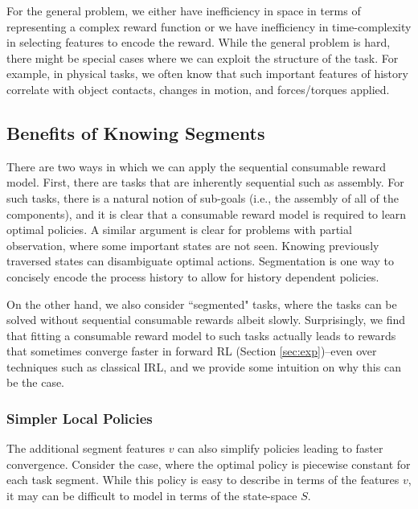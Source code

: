 \vspace{0.5em}

For the general problem, we either have inefficiency in space in terms of representing a complex reward function or we have inefficiency in time-complexity in selecting features to encode the reward.
While the general problem is hard, there might be special cases where we can exploit the structure of the task.
For example, in physical tasks, we often know that such important features of history correlate with object contacts, changes in motion, and forces/torques applied.
\fi

\subsection{Benefits of Knowing Segments}
There are two ways in which we can apply the sequential consumable reward model.
First, there are tasks that are inherently sequential such as assembly.
For such tasks, there is a natural notion of sub-goals (i.e., the assembly of all of the components), and it is clear that a consumable reward model is required to learn optimal policies.
A similar argument is clear for problems with partial observation, where some important states are not seen.
Knowing previously traversed states can disambiguate optimal actions.
Segmentation is one way to concisely encode the process history to allow for history dependent policies.

On the other hand, we also consider ``segmented" tasks, where the tasks can be solved without sequential consumable rewards albeit slowly.
Surprisingly, we find that fitting a consumable reward model to such tasks actually leads to rewards that sometimes converge faster in forward RL (Section \ref{sec:exp})--even over techniques such as classical IRL, and we provide some intuition on why this can be the case.


\subsubsection{Simpler Local Policies} The additional segment features $v$ can also simplify policies leading to faster convergence. Consider the case, where the optimal policy is piecewise constant for each task segment. While this policy is easy to describe in terms of the features $v$, it may can be difficult to model in terms of the state-space $S$.

